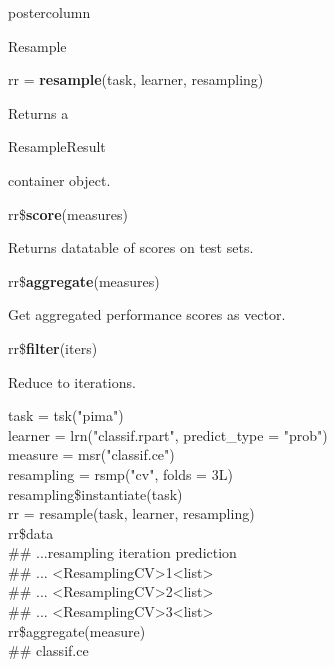 \documentclass{beamer}
\newcommand{\codeinline}[1]{\begin{codeboxinline}#1\end{codeboxinline}}
\newcommand{\monospace}[1]{\multido{}{#1}{\space}}
\begin{document}
\begin{withoutheader}
\begin{frame}[fragile]{}
\begin{columns}
\begin{column}{.245\textwidth}
\begin{beamercolorbox}[center]{postercolumn}
\begin{minipage}{.98\textwidth}
{\begin{myblock}{Resample}
							\begin{codebox}
								rr = \textbf{resample}(task, learner, resampling)
							\end{codebox}
							Returns a \codeinline{ResampleResult} container object.
							\\
							\vspace{1em}
							\begin{codebox}
								rr\$\textbf{score}(measures)
							\end{codebox}
							Returns datatable of scores on test sets.
							\\
							\begin{codebox}
								rr\$\textbf{aggregate}(measures)
							\end{codebox}
						    Get aggregated performance scores as vector.
							\\
							\begin{codebox}
								rr\$\textbf{filter}(iters)
							\end{codebox}
							Reduce to iterations.
							\\
							\begin{codeboxexample}
								\scriptsize{
									task = tsk("pima")\\
									learner = lrn("classif.rpart", predict\_type = "prob")\\
									measure = msr("classif.ce")
									\vspace{1em}
									\\
									resampling = rsmp("cv", folds = 3L)\\
									resampling\$instantiate(task)
									\vspace{1em}
									\\
									rr = resample(task, learner, resampling)
									\vspace{1em}
									\\
									rr\$data\\
									\#\# ...\monospace{3}resampling iteration prediction\\
									\#\# ... <ResamplingCV>\monospace{9}1\monospace{5}<list>\\
									\#\# ... <ResamplingCV>\monospace{9}2\monospace{5}<list>\\
									\#\# ... <ResamplingCV>\monospace{9}3\monospace{5}<list>
									\vspace{1em}
									\\
									rr\$aggregate(measure)\\
									\#\# classif.ce\\
}
\end{codeboxexample}
\end{myblock}}
\end{minipage}
\end{beamercolorbox}
\end{column}
\end{columns}
\end{frame}
\end{withoutheader}
\end{document}
